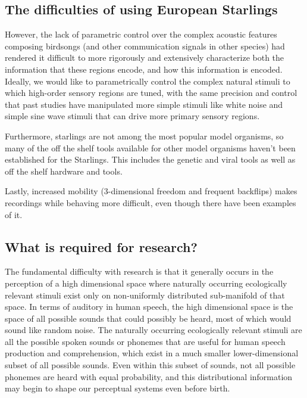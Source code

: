 \subsection{The difficulties of using European Starlings}

However, the lack of parametric control over the complex acoustic features composing birdsongs (and other communication signals in other species) had rendered it difficult to more rigorously and extensively characterize both the information that these regions encode, and how this information is encoded. Ideally, we would like to parametrically control the complex natural stimuli to which high-order sensory regions are tuned, with the same precision and control that past studies have manipulated more simple stimuli like white noise and simple sine wave stimuli that can drive more primary sensory regions.

Furthermore, starlings are not among the most popular model organisms, so many of the off the shelf tools available for other model organisms haven't been established for the Starlings. This includes the genetic and viral tools as well as off the shelf hardware and tools.

Lastly, increased mobility (3-dimensional freedom and frequent backflips) makes recordings while behaving more difficult, even though there have been examples of it\cite{knudsen2013active,bluvas2013attention}.

\subsection{What is required for \CP research?}

The fundamental difficulty with \CP research is that it generally occurs in the perception of a high dimensional space where naturally occurring ecologically relevant stimuli exist only on non-uniformly distributed sub-manifold of that space. In terms of auditory \CP in human speech, the high dimensional space is the space of all possible sounds that could possibly be heard, most of which would sound like random noise. The naturally occurring ecologically relevant stimuli are all the possible spoken sounds or phonemes that are useful for human speech production and comprehension, which exist in a much smaller lower-dimensional subset of all possible sounds. Even within this subset of sounds, not all possible phonemes are heard with equal probability, and this distributional information may begin to shape our perceptual systems even before birth.

